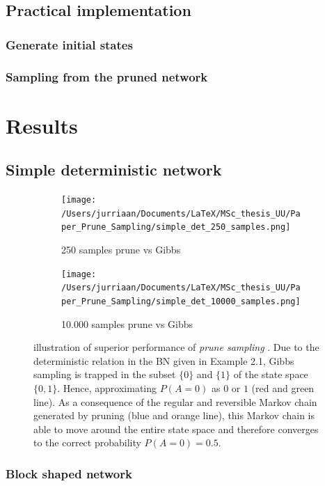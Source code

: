 \documentclass[a4paper, twoside, 11pt]{report}
\theoremstyle{plain}
\theoremstyle{definition}
\theoremstyle{remark}
\newcommand{\ps}{\textit{prune sampling }}
\begin{document}
\section{Practical implementation}\label{sec:prune_2}
\subsection{Generate initial states}
\subsection{Sampling from the pruned network}

\chapter{Results}

\section{Simple deterministic network}

\begin{figure}[h]
\centering
\begin{subfigure}{.49\textwidth}
  \centering
  \texttt{[image: /Users/jurriaan/Documents/LaTeX/MSc\_thesis\_UU/Paper\_Prune\_Sampling/simple\_det\_250\_samples.png]}
  \caption{250 samples prune vs Gibbs}
  \label{fig:sub1}
\end{subfigure}
\begin{subfigure}{.49\textwidth}
  \centering
  \texttt{[image: /Users/jurriaan/Documents/LaTeX/MSc\_thesis\_UU/Paper\_Prune\_Sampling/simple\_det\_10000\_samples.png]}
  \caption{10.000 samples prune vs Gibbs}
  \label{fig:sub2}
\end{subfigure}
\caption{illustration of superior performance of \ps. Due to the deterministic relation in the BN given in Example 2.1, Gibbs sampling is trapped in the subset $\{0\}$ and $\{1\}$ of the state space $\{0,1\}$. Hence, approximating $P(A = 0)$ as $0$ or $1$ (red and green line). As a consequence of the regular and reversible Markov chain generated by pruning (blue and orange line), this Markov chain is able to move around the entire state space and therefore converges to the correct probability $P(A = 0) = 0.5$.}
\label{simple-deterministic}
\end{figure}

\newpage
\subsection{Block shaped network}
\end{document}
